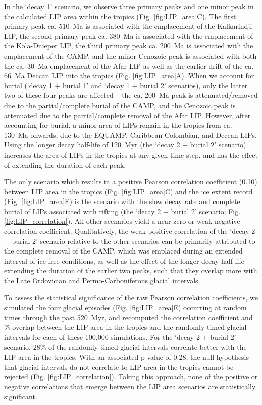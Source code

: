 \documentclass[11pt,letterpaper]{article}
\begin{document}
In the `decay 1' scenario, we observe three primary peaks and one minor peak in the calculated LIP area within the tropics (Fig. \ref{fig:LIP_area}C). The first primary peak ca. 510~Ma is associated with the emplacement of the Kalkarindji LIP, the second primary peak ca. 380~Ma is associated with the emplacement of the Kola-Dnieper LIP, the third primary peak ca. 200~Ma is associated with the emplacement of the CAMP, and the minor Cenozoic peak is associated with both the ca. 30~Ma emplacement of the Afar LIP as well as the earlier drift of the ca. 66~Ma Deccan LIP into the tropics (Fig. \ref{fig:LIP_area}A). When we account for burial (`decay 1 + burial 1' and `decay 1 + burial 2' scenarios), only the latter two of these four peaks are affected -- the ca. 200~Ma peak is attenuated/removed due to the partial/complete burial of the CAMP, and the Cenozoic peak is attenuated due to the partial/complete removal of the Afar LIP. However, after accounting for burial, a minor area of LIPs remain in the tropics from ca. 130~Ma onwards, due to the EQUAMP, Caribbean-Colombian, and Deccan LIPs. Using the longer decay half-life of 120~Myr (the `decay 2 + burial 2' scenario) increases the area of LIPs in the tropics at any given time step, and has the effect of extending the duration of each peak.

The only scenario which results in a positive Pearson correlation coefficient (0.10) between LIP area in the tropics (Fig. \ref{fig:LIP_area}C) and the ice extent record (Fig. \ref{fig:LIP_area}E) is the scenario with the slow decay rate and complete burial of LIPs associated with rifting (the `decay 2 + burial 2' scenario; Fig. \ref{fig:LIP_correlation}). All other scenarios yield a near zero or weak negative correlation coefficient. Qualitatively, the weak positive correlation of the `decay 2 + burial 2' scenario relative to the other scenarios can be primarily attributed to the complete removal of the CAMP, which was emplaced during an extended interval of ice-free conditions, as well as the effect of the longer decay half-life extending the duration of the earlier two peaks, such that they overlap more with the Late Ordovician and Permo-Carboniferous glacial intervals.

To assess the statistical significance of the raw Pearson correlation coefficients, we simulated the four glacial episodes (Fig. \ref{fig:LIP_area}E) occurring at random times through the past 520~Myr, and recomputed the correlation coefficient and \% overlap between the LIP area in the tropics and the randomly timed glacial intervals for each of these 100,000 simulations.  For the `decay 2 + burial 2' scenario, 28\% of the randomly timed glacial intervals correlate better with the LIP area in the tropics. With an associated p-value of 0.28, the null hypothesis that glacial intervals do not correlate to LIP area in the tropics cannot be rejected (Fig. \ref{fig:LIP_correlation}). Taking this approach, none of the positive or negative correlations that emerge between the LIP area scenarios are statistically significant.
\end{document}
